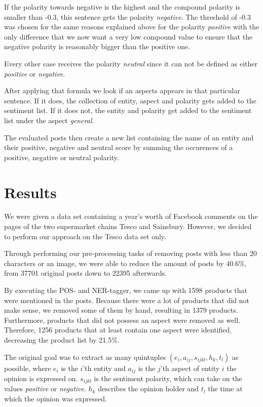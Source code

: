 \documentclass[10pt,a4paper]{article}
\begin{document}
		If the polarity towards negative is the highest and the compound polarity is smaller than -0.3, this sentence gets the polarity \textit{negative}. The threshold of -0.3 was chosen for the same reasons explained above for the polarity \textit{positive} with the only difference that we now want a very low compound value to ensure that the negative polarity is reasonably bigger than the positive one. 
		
		Every other case receives the polarity \textit{neutral} since it can not be defined as either \textit{positive} or \textit{negative}.
		
		After applying that formula we look if an aspects appears in that particular sentence. If it does, the collection of entity, aspect and polarity gets added to the sentiment list. If it does not, the entity and polarity get added to the sentiment list under the aspect \textit{general}.
		
		The evaluated posts then create a new list containing the name of an entity and their positive, negative and neutral score by summing the occurences of a positive, negative or neutral polarity.
		
	\section{Results}
	\label{sec:results}
	
	We were given a data set containing a year's worth of Facebook comments on the pages of the two supermarket chains Tesco and Sainsbury. However, we decided to perform our approach on the Tesco data set only.
	
	Through performing our pre-processing tasks of removing posts with less than 20 characters or an image, we were able to reduce the amount of posts by 40.6\%, from 37701 original posts down to 22395 afterwards.

	By executing the POS- and NER-tagger, we came up with 1598 products that were mentioned in the posts. Because there were a lot of products that did not make sense, we removed some of them by hand, resulting in 1379 products. Furthermore, products that did not possess an aspect were removed as well. Therefore, 1256 products that at least contain one aspect were identified, decreasing the product list by 21.5\%. 

	The original goal was to extract as many quintuples $(e_i, a_{ij}, s_{ijkl}, h_k, t_l)$ as possible, where $e_i$ is the $i$'th entity and $a_{ij}$ is the $j$'th aspect of entity $i$ the opinion is expressed on. $s_{ijkl}$ is the sentiment polarity, which can take on the values \textit{positive} or \textit{negative}. $h_k$ describes the opinion holder and $t_l$ the time at which the opinion was expressed.
\end{document}
